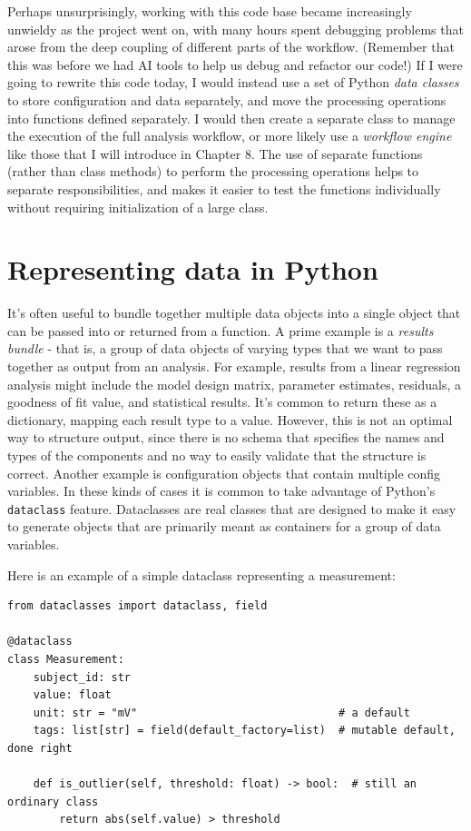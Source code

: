 Perhaps unsurprisingly, working with this code base became increasingly unwieldy as the project went on, with many hours spent debugging problems that arose from the deep coupling of different parts of the workflow. (Remember that this was before we had AI tools to help us debug and refactor our code!) If I were going to rewrite this code today, I would instead use a set of Python \textit{data classes} to store configuration and data separately, and move the processing operations into functions defined separately.
I would then create a separate class to manage the execution of the full analysis workflow, or more likely use a \textit{workflow engine} like those that I will introduce in Chapter 8.
The use of separate functions (rather than class methods) to perform the processing operations helps to separate responsibilities, and makes it easier to test the functions individually without requiring initialization of a large class.


\section{Representing data in Python}

It's often useful to bundle together multiple data objects into a single object that can be passed into or returned from a function. A prime example is a \textit{results bundle} - that is, a group of data objects of varying types that we want to pass together as output from an analysis. For example, results from a linear regression analysis might include the model design matrix, parameter estimates, residuals, a goodness of fit value, and statistical results. It's common to return these as a dictionary, mapping each result type to a value.  However, this is not an optimal way to structure output, since there is no schema that specifies the names and types of the components and no way to easily validate that the structure is correct.  Another example is configuration objects that contain multiple config variables.  In these kinds of cases it is common to take advantage of Python's \texttt{dataclass} feature.  Dataclasses are real classes that are designed to make it easy to generate objects that are primarily meant as containers for a group of data variables.

Here is an example of a simple dataclass representing a measurement:

\begin{lstlisting}[style=Python]
from dataclasses import dataclass, field

@dataclass
class Measurement:
    subject_id: str
    value: float
    unit: str = "mV"                               # a default
    tags: list[str] = field(default_factory=list)  # mutable default, done right

    def is_outlier(self, threshold: float) -> bool:  # still an ordinary class
        return abs(self.value) > threshold
\end{lstlisting}

